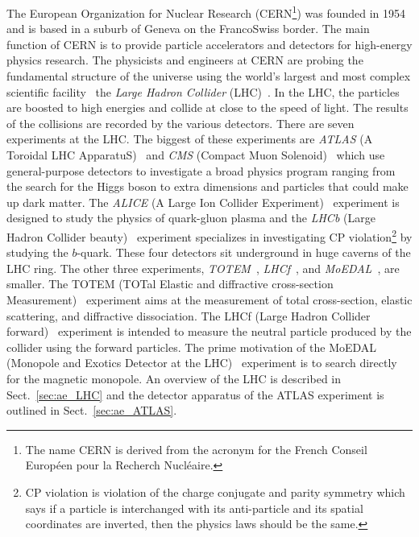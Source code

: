 The European Organization for Nuclear Research (CERN\footnote{The name CERN is derived from the acronym for the French Conseil Europ\'{e}en pour la Recherch Nucl\'{e}aire.}) was founded in 1954 and is based in a suburb of Geneva on the Franco\textendash Swiss border.
The main function of CERN is to provide particle accelerators and detectors for high-energy physics research.
The physicists and engineers at CERN are probing the fundamental structure of the universe using the world's largest and most complex scientific facility \textemdash \ the \textit{Large Hadron Collider} (LHC)~\cite{Evans:2008zzb}.
In the LHC, the particles are boosted to high energies and collide at close to the speed of light.
The results of the collisions are recorded by the various detectors.
There are seven experiments at the LHC.
The biggest of these experiments are \textit{ATLAS} (A Toroidal LHC ApparatuS)~\cite{Aad:2008zzm} and \textit{CMS} (Compact Muon Solenoid)~\cite{Chatrchyan:2008aa} which use general-purpose detectors to investigate a broad physics program ranging from the search for the Higgs boson to extra dimensions and particles that could make up dark matter.
The \textit{ALICE} (A Large Ion Collider Experiment)~\cite{Aamodt:2008zz} experiment is designed to study the physics of quark-gluon plasma and the \textit{LHCb} (Large Hadron Collider beauty)~\cite{Alves:2008zz} experiment specializes in investigating CP violation\footnote{CP violation is violation of the charge conjugate and parity symmetry which says if a particle is interchanged with its anti-particle and its spatial coordinates are inverted, then the physics laws should be the same.} by studying the $b$-quark.
These four detectors sit underground in huge caverns of the LHC ring.
The other three experiments, \textit{TOTEM}~\cite{Anelli:2008zza}, \textit{LHCf}~\cite{Adriani:2008zz}, and \textit{MoEDAL}~\cite{Pinfold:2009oia}, are smaller.
The TOTEM (TOTal Elastic and diffractive cross-section Measurement)~\cite{Anelli:2008zza} experiment aims at the measurement of total cross-section, elastic scattering, and diffractive dissociation.
The LHCf (Large Hadron Collider forward)~\cite{Adriani:2008zz} experiment is intended to measure the neutral particle produced by the collider using the forward particles.
The prime motivation of the MoEDAL (Monopole and Exotics Detector at the LHC)~\cite{Pinfold:2009oia} experiment is to search directly for the magnetic monopole.
An overview of the LHC is described in Sect.~\ref{sec:ae_LHC} and the detector apparatus of the ATLAS experiment is outlined in Sect.~\ref{sec:ae_ATLAS}.

